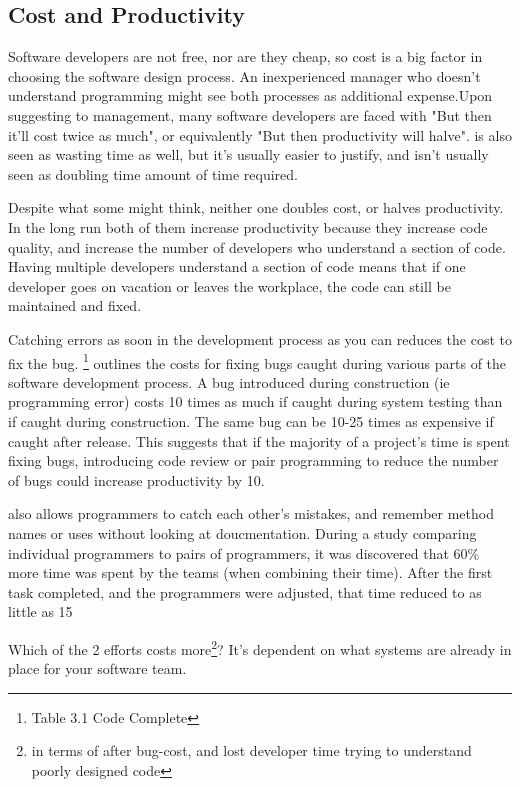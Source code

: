 \documentclass{article}
\begin{document}
\subsection{Cost and Productivity}

Software developers are not free, nor are they cheap, so cost is a big factor in choosing the software design process. An inexperienced manager who doesn't understand programming might see both processes as additional expense.Upon suggesting \PP to management, many software developers are faced with "But then it'll cost twice as much", or equivalently "But then productivity will halve". \CR is also seen as wasting time as well, but it's usually easier to justify, and isn't usually seen as doubling time amount of time required.

Despite what some might think, neither one doubles cost, or halves productivity. In the long run both of them increase productivity because they increase code quality, and increase the number of developers who understand a section of code. Having multiple developers understand a section of code means that if one developer goes on vacation or leaves the workplace, the code can still be maintained and fixed.

Catching errors as soon in the development process as you can reduces the cost to fix the bug. \cite{avgCostOfDefect}\footnote{Table 3.1 Code Complete} outlines the costs for fixing bugs caught during various parts of the software development process. A bug introduced during construction (ie programming error) costs 10 times as much if caught during system testing than if caught during construction. The same bug can be 10-25 times as expensive if caught after release. This suggests that if the majority of a project's time is spent fixing bugs, introducing code review or pair programming to reduce the number of bugs could increase productivity by 10.

\PP also allows programmers to catch each other's mistakes, and remember method names or uses without looking at doucmentation. During a study comparing individual programmers to pairs of programmers, it was discovered that 60\% more time was spent by the teams (when combining their time). After the first task completed, and the programmers were adjusted, that time reduced to as little as 15%

Which of the 2 efforts costs more\footnote{in terms of after bug-cost, and lost developer time trying to understand poorly designed code}? It's dependent on what systems are already in place for your software team. 
\end{document}
